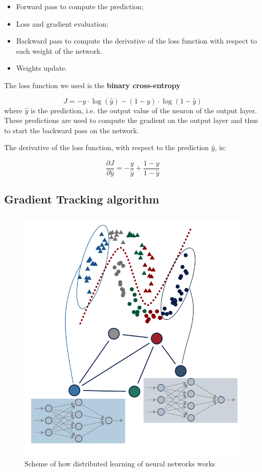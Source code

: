 \documentclass[a4paper,11pt,oneside]{book}
\begin{document}
\begin{itemize}
    \item Forward pass to compute the prediction;
    \item Loss and gradient evaluation;
    \item Backward pass to compute the derivative of the loss function with respect to each weight of the network.
    \item Weights update.
\end{itemize}

The loss function we used is the \textbf{binary cross-entropy} 

\begin{equation}
J = - y \cdot \log(\hat{y}) - (1 - y) \cdot \log(1 - \hat{y})
\label{Cost_funct}
\end{equation}
where $\hat{y}$ is the prediction, i.e. the output value of the neuron of the output layer. These predictions are used to compute the gradient on the output layer and thus to start the backward pass on the network.

The derivative of the loss function, with respect to the prediction $\hat{y}$, is:

\begin{equation}
\frac{\partial J}{\partial \hat{y}} = - \frac{y}{\hat{y}} + \frac{1 - y}{1 - \hat{y}}
\end{equation}

\subsection{Gradient Tracking algorithm}

\begin{figure}[h]
	\centering
	\includegraphics[scale=0.2]{Distributed_learning}
	\caption{Scheme of how distributed learning of neural networks works}
	\label{Distributed_learning}
\end{figure}
\end{document}
